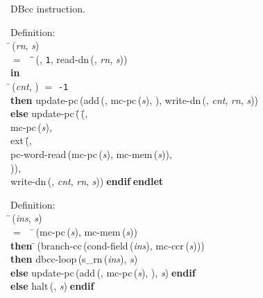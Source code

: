  DBcc instruction.
\begin{tabbing}{\sc Definition}: \\  
\=\,({\it{rn\/}}, {\it{s\/}}) \\ 
$=$$\;\;\;\;$\=\=\,({}, {\tt{1}}, {\rm{read-dn}}\,({}, {\it{rn\/}}, {\it{s\/}}))\- \\ 
{\bf in} \\ 
\=\,({\it{cnt\/}}, {}) $=$ {\tt{-1}} \\ 
{\bf then }{\rm{update-pc}}\,({\rm{add}}\,({}, {\rm{mc-pc}}\,({\it{s\/}}), {}), {\rm{write-dn}}\,({}, {\it{cnt\/}}, {\it{rn\/}}, {\it{s\/}})) \\ 
{\bf else }{\rm{update-pc}}\,(\=\,(\=, \\ 
{\rm{mc-pc}}\,({\it{s\/}}), \\ 
{\rm{ext}}\,(\=, \\ 
{\rm{pc-word-read}}\,({\rm{mc-pc}}\,({\it{s\/}}), {\rm{mc-mem}}\,({\it{s\/}})), \\ 
{})\-)\-, \\ 
{\rm{write-dn}}\,({}, {\it{cnt\/}}, {\it{rn\/}}, {\it{s\/}}))\-$\;${\bf  endif}\-$\;${\bf  endlet}\-\-
\end{tabbing}

\begin{tabbing}{\sc Definition}: \\  
\=\,({\it{ins\/}}, {\it{s\/}}) \\ 
$=$$\;\;\;\;$\=\,({\rm{mc-pc}}\,({\it{s\/}}), {\rm{mc-mem}}\,({\it{s\/}})) \\ 
{\bf then }\=\,({\rm{branch-cc}}\,({\rm{cond-field}}\,({\it{ins\/}}), {\rm{mc-ccr}}\,({\it{s\/}}))) \\ 
{\bf then }{\rm{dbcc-loop}}\,({\rm{s\_rn}}\,({\it{ins\/}}), {\it{s\/}}) \\ 
{\bf else }{\rm{update-pc}}\,({\rm{add}}\,({}, {\rm{mc-pc}}\,({\it{s\/}}), {}), {\it{s\/}})$\;${\bf  endif}\- \\ 
{\bf else }{\rm{halt}}\,({}, {\it{s\/}})$\;${\bf  endif}\-\-
\end{tabbing}

